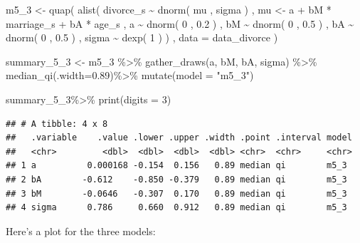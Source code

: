 \documentclass[
]{book}
\newenvironment{Shaded}{\begin{snugshade}}{\end{snugshade}}
\newcommand{\AttributeTok}[1]{\textcolor[rgb]{0.77,0.63,0.00}{#1}}
\newcommand{\DecValTok}[1]{\textcolor[rgb]{0.00,0.00,0.81}{#1}}
\newcommand{\FloatTok}[1]{\textcolor[rgb]{0.00,0.00,0.81}{#1}}
\newcommand{\FunctionTok}[1]{\textcolor[rgb]{0.00,0.00,0.00}{#1}}
\newcommand{\NormalTok}[1]{#1}
\newcommand{\OtherTok}[1]{\textcolor[rgb]{0.56,0.35,0.01}{#1}}
\newcommand{\SpecialCharTok}[1]{\textcolor[rgb]{0.00,0.00,0.00}{#1}}
\newcommand{\StringTok}[1]{\textcolor[rgb]{0.31,0.60,0.02}{#1}}
\begin{document}
\begin{Shaded}
\begin{Highlighting}[]
\NormalTok{m5\_3 }\OtherTok{\textless{}{-}} \FunctionTok{quap}\NormalTok{( }
  \FunctionTok{alist}\NormalTok{( }
\NormalTok{    divorce\_s }\SpecialCharTok{\textasciitilde{}} \FunctionTok{dnorm}\NormalTok{( mu , sigma ) , }
\NormalTok{    mu }\OtherTok{\textless{}{-}}\NormalTok{ a }\SpecialCharTok{+}\NormalTok{ bM }\SpecialCharTok{*}\NormalTok{ marriage\_s }\SpecialCharTok{+}\NormalTok{ bA }\SpecialCharTok{*}\NormalTok{ age\_s , }
\NormalTok{    a }\SpecialCharTok{\textasciitilde{}} \FunctionTok{dnorm}\NormalTok{( }\DecValTok{0}\NormalTok{ , }\FloatTok{0.2}\NormalTok{ ) , }
\NormalTok{    bM }\SpecialCharTok{\textasciitilde{}} \FunctionTok{dnorm}\NormalTok{( }\DecValTok{0}\NormalTok{ , }\FloatTok{0.5}\NormalTok{ ) ,}
\NormalTok{    bA }\SpecialCharTok{\textasciitilde{}} \FunctionTok{dnorm}\NormalTok{( }\DecValTok{0}\NormalTok{ , }\FloatTok{0.5}\NormalTok{ ) , }
\NormalTok{    sigma }\SpecialCharTok{\textasciitilde{}} \FunctionTok{dexp}\NormalTok{( }\DecValTok{1}\NormalTok{ )}
\NormalTok{) , }\AttributeTok{data =}\NormalTok{ data\_divorce )}

\NormalTok{summary\_5\_3 }\OtherTok{\textless{}{-}}\NormalTok{ m5\_3 }\SpecialCharTok{\%\textgreater{}\%}
  \FunctionTok{gather\_draws}\NormalTok{(a, bM, bA, sigma) }\SpecialCharTok{\%\textgreater{}\%}
  \FunctionTok{median\_qi}\NormalTok{(}\AttributeTok{.width=}\FloatTok{0.89}\NormalTok{)}\SpecialCharTok{\%\textgreater{}\%}
  \FunctionTok{mutate}\NormalTok{(}\AttributeTok{model =} \StringTok{"m5\_3"}\NormalTok{)}

\NormalTok{summary\_5\_3}\SpecialCharTok{\%\textgreater{}\%}
  \FunctionTok{print}\NormalTok{(}\AttributeTok{digits =} \DecValTok{3}\NormalTok{)}
\end{Highlighting}
\end{Shaded}

\begin{verbatim}
## # A tibble: 4 x 8
##   .variable    .value .lower .upper .width .point .interval model
##   <chr>         <dbl>  <dbl>  <dbl>  <dbl> <chr>  <chr>     <chr>
## 1 a          0.000168 -0.154  0.156   0.89 median qi        m5_3 
## 2 bA        -0.612    -0.850 -0.379   0.89 median qi        m5_3 
## 3 bM        -0.0646   -0.307  0.170   0.89 median qi        m5_3 
## 4 sigma      0.786     0.660  0.912   0.89 median qi        m5_3
\end{verbatim}

Here's a plot for the three models:
\end{document}
